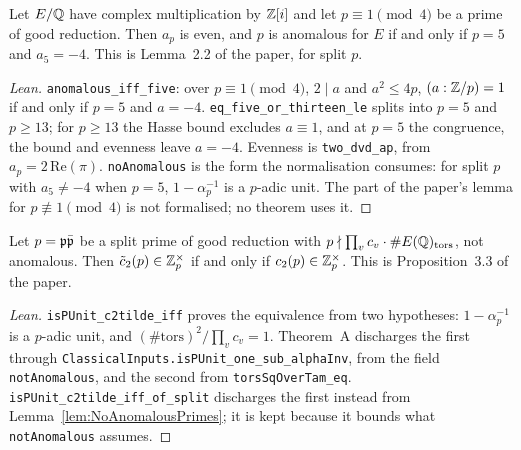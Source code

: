 \begin{lemma}
  \label{lem:NoAnomalousPrimes}
  \leanok
  Let $E/\mathbb{Q}$ have complex multiplication by $\mathbb{Z}[i]$ and let
  $p \equiv 1 \pmod 4$ be a prime of good reduction. Then $a_p$ is even,
  and $p$ is anomalous for $E$ if and only if $p = 5$ and $a_5 = -4$.
  This is Lemma~2.2 of the paper, for split $p$.
\end{lemma}
\begin{proof}[Lean]
  \leanok
  \texttt{anomalous\_iff\_five}: over $p \equiv 1 \pmod 4$, $2 \mid a$ and
  $a^2 \le 4p$, $(a : \mathbb{Z}/p) = 1$ if and only if $p = 5$ and $a = -4$.
  \texttt{eq\_five\_or\_thirteen\_le} splits into $p = 5$ and $p \ge 13$;
  for $p \ge 13$ the Hasse bound excludes $a \equiv 1$, and at $p = 5$ the
  congruence, the bound and evenness leave $a = -4$. Evenness is
  \texttt{two\_dvd\_ap}, from $a_p = 2\,\mathrm{Re}(\pi)$.
  \texttt{noAnomalous} is the form the normalisation consumes: for split
  $p$ with $a_5 \ne -4$ when $p = 5$, $1 - \alpha_p^{-1}$ is a $p$-adic
  unit. The part of the paper's lemma for $p \not\equiv 1 \pmod 4$ is not
  formalised; no theorem uses it.
\end{proof}

\begin{proposition}[Normalisation]
  \label{prop:Normalisation}
  \leanok
  Let $p = {\mathfrak{p}}\bar{{\mathfrak{p}}}$ be a split prime of good reduction with
  $p \nmid \prod_v c_v \cdot \#E(\mathbb{Q})_{\mathrm{tors}}$, not anomalous. Then
  $\tilde c_2(p) \in \mathbb{Z}_p^\times$ if and only if $c_2(p) \in \mathbb{Z}_p^\times$.
  This is Proposition~3.3 of the paper.
\end{proposition}
\begin{proof}[Lean]
  \leanok
  \texttt{isPUnit\_c2tilde\_iff} proves the equivalence from two
  hypotheses: $1 - \alpha_p^{-1}$ is a $p$-adic unit, and
  $(\#\mathrm{tors})^2/\prod_v c_v = 1$. Theorem~A discharges the first
  through \texttt{ClassicalInputs.isPUnit\_one\_sub\_alphaInv}, from the
  field \texttt{notAnomalous}, and the second from
  \texttt{torsSqOverTam\_eq}. \texttt{isPUnit\_c2tilde\_iff\_of\_split}
  discharges the first instead from Lemma~\ref{lem:NoAnomalousPrimes}; it
  is kept because it bounds what \texttt{notAnomalous} assumes.
\end{proof}

